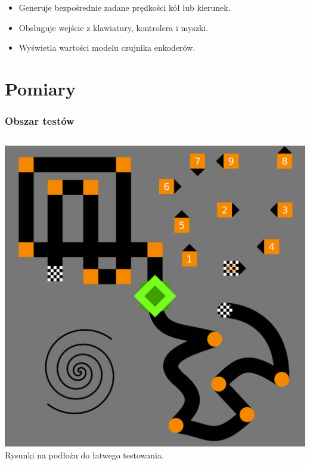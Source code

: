 \documentclass{beamer}
\begin{document}
\begin{frame}
\begin{columns}[c]
		\end{columns}
		\begin{itemize}
			\item Generuje bezpośrednie zadane prędkości kół lub kierunek.
			\item Obsługuje wejście z klawiatury, kontrolera i myszki.
			\item Wyświetla wartości modelu czujnika enkoderów.
		\end{itemize}
	\end{frame}
	
	\section{Pomiary}
	\begin{frame}
		\frametitle{Obszar testów}
		\begin{columns}[c]
			\centering
			\includegraphics[width=\textwidth]{graphics/testfloor.png} \\
			Rysunki na podłożu do łatwego testowania.
			\centering

\end{columns}
\end{frame}
\end{document}
